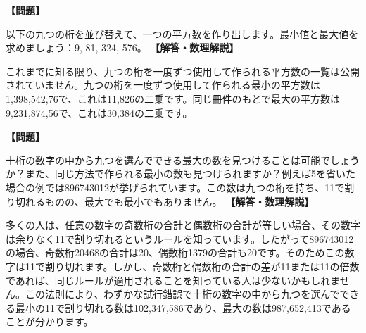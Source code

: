\documentclass[10pt,a4paper,oneside,openany]{ltjsbook}
\begin{document}
\begin{tcolorbox}[colback=softblue,colframe=primaryblue,title=\textbf{第 92 問：数字で表された平方数 （原題: DIGITAL SQUARE NUMBERS.）},arc=2mm,boxrule=1pt,breakable]
\textbf{【問題】}\par\vspace{0.3em}
以下の九つの桁を並び替えて、一つの平方数を作り出します。最小値と最大値を求めましょう：9, 81, 324, 576。
\tcblower
\textbf{【解答・数理解説】}\par\vspace{0.3em}
これまでに知る限り、九つの桁を一度ずつ使用して作られる平方数の一覧は公開されていません。九つの桁を一度ずつ使用して作られる最小の平方数は1,398,542,76で、これは11,826の二乗です。同じ冊件のもとで最大の平方数は9,231,874,56で、これは30,384の二乗です。
\end{tcolorbox}

\begin{tcolorbox}[colback=softblue,colframe=primaryblue,title=\textbf{第 93 問：神祕の十一 （原題: THE MYSTIC ELEVEN.）},arc=2mm,boxrule=1pt,breakable]
\textbf{【問題】}\par\vspace{0.3em}
十桁の数字の中から九つを選んでできる最大の数を見つけることは可能でしょうか？また、同じ方法で作られる最小の数も見つけられますか？例えば5を省いた場合の例では896743012が挙げられています。この数は九つの桁を持ち、11で割り切れるものの、最大でも最小でもありません。
\tcblower
\textbf{【解答・数理解説】}\par\vspace{0.3em}
多くの人は、任意の数字の奇数桁の合計と偶数桁の合計が等しい場合、その数字は余りなく11で割り切れるというルールを知っています。したがって896743012の場合、奇数桁20468の合計は20、偶数桁1379の合計も20です。そのためこの数字は11で割り切れます。しかし、奇数桁と偶数桁の合計の差が11または11の倍数であれば、同じルールが適用されることを知っている人は少ないかもしれません。この法則により、わずかな試行錯誤で十桁の数字の中から九つを選んでできる最小の11で割り切れる数は102,347,586であり、最大の数は987,652,413であることが分かります。
\end{tcolorbox}
\end{document}
